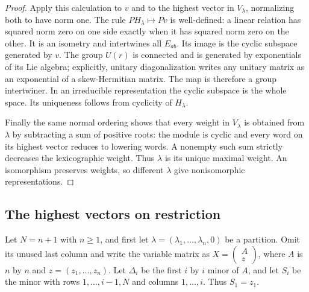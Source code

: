 \begin{proof}
Apply this calculation to $v$ and to the highest vector in
$V_\lambda$, normalizing both to have norm one.
The rule $PH_\lambda\mapsto Pv$ is well-defined: a linear
relation has squared norm zero on one side exactly when it
has squared norm zero on the other.  It is an isometry and
intertwines all $E_{ab}$.  Its image is the cyclic subspace
generated by $v$.  The group $U(r)$ is connected and is
generated by exponentials of its Lie algebra; explicitly,
unitary diagonalization writes any unitary matrix as an
exponential of a skew-Hermitian matrix.  The map is therefore
a group intertwiner.  In an irreducible representation the
cyclic subspace is the whole space.  Its uniqueness follows
from cyclicity of $H_\lambda$.

Finally the same normal ordering shows that every weight in
$V_\lambda$ is obtained from $\lambda$ by subtracting a sum
of positive roots: the module is cyclic and every word on
its highest vector reduces to lowering words.  A nonempty
such sum strictly decreases the lexicographic weight.
Thus $\lambda$ is its unique maximal weight.  An isomorphism
preserves weights, so different $\lambda$ give nonisomorphic
representations.
\end{proof}

\subsection{The highest vectors on restriction}

Let $N=n+1$ with $n\ge1$, and first let
$\lambda=(\lambda_1,\ldots,\lambda_n,0)$ be a partition.
Omit its unused last column and write the variable matrix as
$X=\left(\begin{smallmatrix}A\\z\end{smallmatrix}\right)$,
where $A$ is $n$ by $n$ and $z=(z_1,\ldots,z_n)$.
Let $\Delta_i$ be the first $i$ by $i$ minor of $A$, and let
$S_i$ be the minor with rows $1,\ldots,i-1,N$ and columns
$1,\ldots,i$.  Thus $S_1=z_1$.

